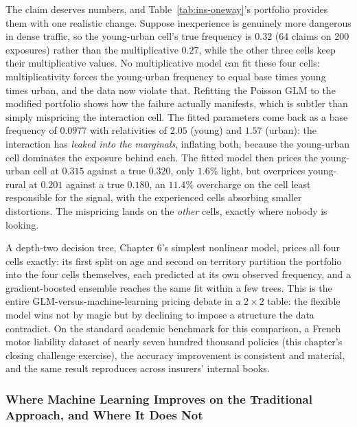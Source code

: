 \documentclass[../ai_in_finance]{subfiles}
\begin{document}
The claim deserves numbers, and Table~\ref{tab:ins-oneway}'s portfolio provides them with one realistic change. Suppose inexperience is genuinely more dangerous in dense traffic, so the young-urban cell's true frequency is $0.32$ ($64$ claims on $200$ exposures) rather than the multiplicative $0.27$, while the other three cells keep their multiplicative values. No multiplicative model can fit these four cells: multiplicativity forces the young-urban frequency to equal base times young times urban, and the data now violate that. Refitting the Poisson GLM to the modified portfolio shows how the failure actually manifests, which is subtler than simply mispricing the interaction cell. The fitted parameters come back as a base frequency of $0.0977$ with relativities of $2.05$ (young) and $1.57$ (urban): the interaction has \emph{leaked into the marginals}, inflating both, because the young-urban cell dominates the exposure behind each. The fitted model then prices the young-urban cell at $0.315$ against a true $0.320$, only $1.6\%$ light, but overprices young-rural at $0.201$ against a true $0.180$, an $11.4\%$ overcharge on the cell least responsible for the signal, with the experienced cells absorbing smaller distortions. The mispricing lands on the \emph{other} cells, exactly where nobody is looking.

A depth-two decision tree, Chapter 6's simplest nonlinear model, prices all four cells exactly: its first split on age and second on territory partition the portfolio into the four cells themselves, each predicted at its own observed frequency, and a gradient-boosted ensemble reaches the same fit within a few trees. This is the entire GLM-versus-machine-learning pricing debate in a $2 \times 2$ table: the flexible model wins not by magic but by declining to impose a structure the data contradict. On the standard academic benchmark for this comparison, a French motor liability dataset of nearly seven hundred thousand policies (this chapter's closing challenge exercise), the accuracy improvement is consistent and material, and the same result reproduces across insurers' internal books.

\subsubsection*{Where Machine Learning Improves on the Traditional Approach, and Where It Does Not}
\label{sec:ins-beyond-glm}
\end{document}
